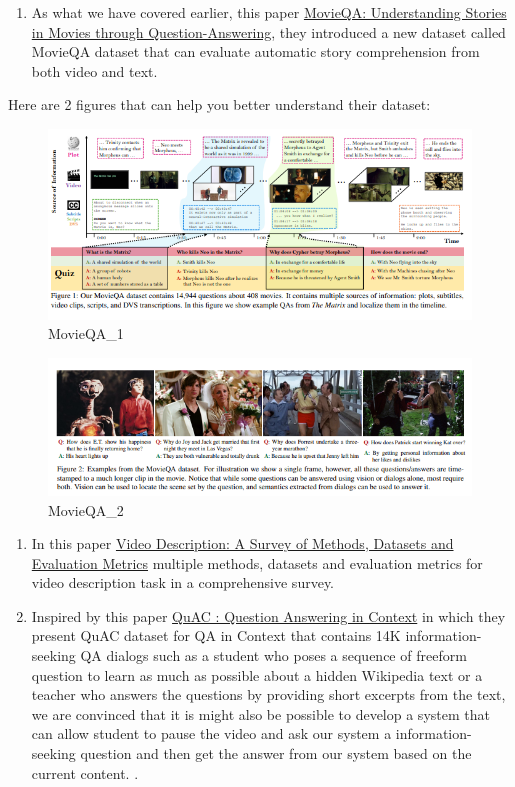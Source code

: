 \documentclass[]{book}
\providecommand{\tightlist}{%
  \setlength{\itemsep}{0pt}\setlength{\parskip}{0pt}}
\theoremstyle{definition}
\theoremstyle{definition}
\theoremstyle{definition}
\theoremstyle{remark}
\begin{document}
\begin{enumerate}
\def\labelenumi{\arabic{enumi}.}
\setcounter{enumi}{3}
\tightlist
\item
  As what we have covered earlier, this paper
  \href{https://arxiv.org/pdf/1512.02902.pdf}{MovieQA: Understanding
  Stories in Movies through Question-Answering}, they introduced a new
  dataset called MovieQA dataset that can evaluate automatic story
  comprehension from both video and text.
\end{enumerate}

Here are 2 figures that can help you better understand their dataset:

\begin{figure}
\centering
\includegraphics{img/movieqa1.png}
\caption{MovieQA\_1}
\end{figure}

\begin{figure}
\centering
\includegraphics{img/movieqa2.png}
\caption{MovieQA\_2}
\end{figure}

\begin{enumerate}
\def\labelenumi{\arabic{enumi}.}
\setcounter{enumi}{4}
\item
  In this paper \href{https://arxiv.org/pdf/1806.00186.pdf}{Video
  Description: A Survey of Methods, Datasets and Evaluation Metrics}
  multiple methods, datasets and evaluation metrics for video
  description task in a comprehensive survey.
\item
  Inspired by this paper
  \href{https://arxiv.org/pdf/1808.07036.pdf}{QuAC : Question Answering
  in Context} in which they present QuAC dataset for QA in Context that
  contains 14K information-seeking QA dialogs such as a student who
  poses a sequence of freeform question to learn as much as possible
  about a hidden Wikipedia text or a teacher who answers the questions
  by providing short excerpts from the text, we are convinced that it is
  might also be possible to develop a system that can allow student to
  pause the video and ask our system a information-seeking question and
  then get the answer from our system based on the current content. .
\end{enumerate}
\end{document}
